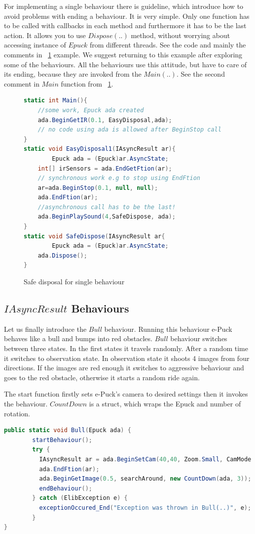 \documentclass[12pt,notitlepage]{report}
\begin{document}
	For implementing a single behaviour there is guideline, which introduce how to avoid problems with ending a behaviour.
	It is very simple. Only one function has to be called  with callbacks in each method and 
	furthermore it has to be the last action. It allows you to use $Dispose(..)$ method, 
	without worrying about accessing instance of $Epuck$  from different threads.
	See the code and mainly the comments in ~\ref{safedis} example. 
	We suggest returning to this example after exploring some of the behaviours.
	All the behaviours use this attitude, but have to care of its ending, because they are invoked from the $Main(..)$. 
	See the second comment in $Main$ function from ~\ref{safedis}.
\begin{figure}[!hbp]	
\begin{lstlisting}[language=cs]
static int Main(){
	//some work, Epuck ada created
	ada.BeginGetIR(0.1, EasyDisposal,ada);
	// no code using ada is allowed after BeginStop call
}
static void EasyDisposal1(IAsyncResult ar){
        Epuck ada = (Epuck)ar.AsyncState;
	int[] irSensors = ada.EndGetFtion(ar);
	// synchronous work e.g to stop using EndFtion
	ar=ada.BeginStop(0.1, null, null);
	ada.EndFtion(ar);
	//asynchronous call has to be the last!
	ada.BeginPlaySound(4,SafeDispose, ada);
}
static void SafeDispose(IAsyncResult ar{
        Epuck ada = (Epuck)ar.AsyncState;
	ada.Dispose();
}
\end{lstlisting}
\caption{Safe disposal for single behaviour} \label{safedis}
\end{figure}

\subsection{$IAsyncResult$ Behaviours}\label{sec:iabehaviors}\label{sec:bull}
	Let us finally introduce the $Bull$ behaviour.
	Running this behaviour e-Puck behaves like a bull and bumps into red obstacles.
	$Bull$ behaviour switches between three states. In the first states it travels randomly. 
	After a random time it switches to observation state.
	In observation state it shoots 4 images from four directions. If the images are red enough 
	it switches to aggressive behaviour and goes to the red obstacle,
	otherwise it starts a random ride again.

	
	The start function firstly sets e-Puck's camera to desired settings then it invokes the behaviour.
	$CountDown$ is a struct, which wraps the Epuck and number of rotation.

\begin{lstlisting}[language=cs]
public static void Bull(Epuck ada) {
        startBehaviour();
        try {
          IAsyncResult ar = ada.BeginSetCam(40,40, Zoom.Small, CamMode.Color, toSetCam, null, null);
          ada.EndFtion(ar);
          ada.BeginGetImage(0.5, searchAround, new CountDown(ada, 3));
          endBehaviour();
        } catch (ElibException e) {
          exceptionOccured_End("Exception was thrown in Bull(..)", e);
        }
}
\end{lstlisting}
	
\end{document}
